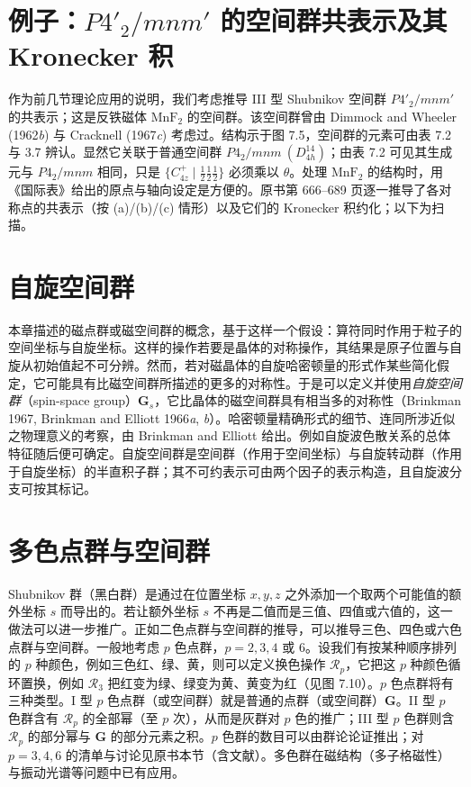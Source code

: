 

\section{例子：$P4'_{2}/mnm'$ 的空间群共表示及其 Kronecker 积}

作为前几节理论应用的说明，我们考虑推导 III 型 Shubnikov 空间群 $P4'_{2}/mnm'$ 的共表示；这是反铁磁体 $\mathrm{MnF}_{2}$ 的空间群。该空间群曾由 Dimmock and Wheeler (1962\textit{b}) 与 Cracknell (1967\textit{c}) 考虑过。结构示于图 7.5，空间群的元素可由表 7.2 与 3.7 辨认。显然它关联于普通空间群 $P4_{2}/mnm\ (D^{14}_{4h})$；由表 7.2 可见其生成元与 $P4_{2}/mnm$ 相同，只是 $\{C^{+}_{4z} \mid {\frac{1}{2}}{\frac{1}{2}}{\frac{1}{2}}\}$ 必须乘以 $\theta$。处理 $\mathrm{MnF}_{2}$ 的结构时，用《国际表》给出的原点与轴向设定是方便的。原书第 666--689 页逐一推导了各对称点的共表示（按 (a)/(b)/(c) 情形）以及它们的 Kronecker 积约化；以下为扫描。



\section{自旋空间群}

本章描述的磁点群或磁空间群的概念，基于这样一个假设：算符同时作用于粒子的空间坐标与自旋坐标。这样的操作若要是晶体的对称操作，其结果是原子位置与自旋从初始值起不可分辨。然而，若对磁晶体的自旋哈密顿量的形式作某些简化假定，它可能具有比磁空间群所描述的更多的对称性。于是可以定义并使用\textit{自旋空间群}（spin-space group）$\mathbf{G}_{s}$，它比晶体的磁空间群具有相当多的对称性（Brinkman 1967, Brinkman and Elliott 1966\textit{a}, \textit{b}）。哈密顿量精确形式的细节、连同所涉近似之物理意义的考察，由 Brinkman and Elliott 给出。例如自旋波色散关系的总体特征随后便可确定。自旋空间群是空间群（作用于空间坐标）与自旋转动群（作用于自旋坐标）的半直积子群；其不可约表示可由两个因子的表示构造，且自旋波分支可按其标记。

\section{多色点群与空间群}

Shubnikov 群（黑白群）是通过在位置坐标 $x, y, z$ 之外添加一个取两个可能值的额外坐标 $s$ 而导出的。若让额外坐标 $s$ 不再是二值而是三值、四值或六值的，这一做法可以进一步推广。正如二色点群与空间群的推导，可以推导三色、四色或六色点群与空间群。一般地考虑 $p$ 色点群，$p = 2, 3, 4$ 或 6。设我们有按某种顺序排列的 $p$ 种颜色，例如三色红、绿、黄，则可以定义换色操作 $\mathcal{R}_{p}$，它把这 $p$ 种颜色循环置换，例如 $\mathcal{R}_{3}$ 把红变为绿、绿变为黄、黄变为红（见图 7.10）。$p$ 色点群将有三种类型。I 型 $p$ 色点群（或空间群）就是普通的点群（或空间群）$\mathbf{G}$。II 型 $p$ 色群含有 $\mathcal{R}_{p}$ 的全部幂（至 $p$ 次），从而是灰群对 $p$ 色的推广；III 型 $p$ 色群则含 $\mathcal{R}_{p}$ 的部分幂与 $\mathbf{G}$ 的部分元素之积。$p$ 色群的数目可以由群论论证推出；对 $p = 3, 4, 6$ 的清单与讨论见原书本节（含文献）。多色群在磁结构（多子格磁性）与振动光谱等问题中已有应用。
